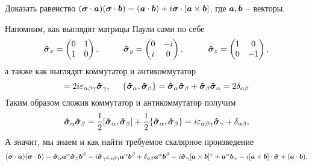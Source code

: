 \begin{leftrules}
	Доказать равенство $(\mbox{\boldmath $\sigma$} \cdot \mbox{\boldmath $a$})(\mbox{\boldmath $\sigma$} \cdot \mbox{\boldmath $b$}) = (\mbox{\boldmath $a$} \cdot \mbox{\boldmath $b$}) + i \mbox{\boldmath $\sigma$}\cdot [\mbox{\boldmath $a$} \times \mbox{\boldmath $b$}]$, где $\mbox{\boldmath $a$}, \mbox{\boldmath $b$}$ -- векторы.
\end{leftrules}
Напомним, как выглядят матрицы Паули сами по себе
\begin{equation*}
	\mbox{\boldmath $\hat{\sigma}$}_x = \begin{pmatrix}
	    0 & 1 \\
	    1 & 0 \\
	\end{pmatrix},
	\hspace{1 cm}
	\mbox{\boldmath $\hat{\sigma}$}_y = \begin{pmatrix}
	    0 & -i \\
	    i & 0 \\
	\end{pmatrix},
	\hspace{1 cm}
	\mbox{\boldmath $\hat{\sigma}$}_z = \begin{pmatrix}
	    1 & 0 \\
	    0 & -1 \\
	\end{pmatrix},
\end{equation*}
а также как выглядят коммутатор и антикоммутатор
\begin{equation*}
	[\vc{\hat{\sigma}}_\alpha, \vc{\hat{\sigma}}_\beta] 
	= 2 i \varepsilon_{\alpha \beta \gamma} \vc{\hat{\sigma}}_\gamma,
	\hspace{0.5 cm}
	\{\vc{\hat{\sigma}}_\alpha, \vc{\hat{\sigma}}_\beta\}
	= \vc{\hat{\sigma}}_\alpha \vc{\hat{\sigma}}_\beta + \vc{\hat{\sigma}}_\beta \vc{\hat{\sigma}}_\alpha
	= 2 \delta_{\alpha \beta}
\end{equation*}
Таким образом сложив коммутатор и антикоммутатор получим
\begin{equation*}
	\mbox{\boldmath $\hat{\sigma}$}_\alpha \mbox{\boldmath $\hat{\sigma}$}_\beta  = \frac{1}{2} [\mbox{\boldmath $\hat{\sigma}$}_\alpha, \mbox{\boldmath $\hat{\sigma}$}_\beta] + \frac{1}{2} \{\mbox{\boldmath $\hat{\sigma}$}_\alpha, \mbox{\boldmath $\hat{\sigma}$}_\beta\}
	=
	i \varepsilon_{\alpha \beta \gamma} \mbox{\boldmath $\hat{\sigma}$}_\gamma + \delta_{\alpha\beta},
\end{equation*}
А значит, мы знаем и как найти требуемое скалярное произведение
\begin{equation*}
	(\mbox{\boldmath $\sigma$} \cdot \mbox{\boldmath $a$})(\mbox{\boldmath $\sigma$} \cdot \mbox{\boldmath $b$}) = 
	\mbox{\boldmath $\hat{\sigma}$}_\alpha \mbox{\boldmath $a$}^\alpha  \mbox{\boldmath $\hat{\sigma}$}_\beta \mbox{\boldmath $b$}^\beta
	=
	i \mbox{\boldmath $\hat{\sigma}$}_\gamma \varepsilon_{\alpha \beta \gamma} \mbox{\boldmath $a$}^\alpha \mbox{\boldmath $b$}^\beta  + \delta_{\alpha\beta} \mbox{\boldmath $a$}^\alpha \mbox{\boldmath $b$}^\beta
	=
	i \mbox{\boldmath $\hat{\sigma}$}_\gamma [\mbox{\boldmath $a$} \times \mbox{\boldmath $b$}]^\gamma + \mbox{\boldmath $a$}^\alpha \mbox{\boldmath $b$}_\alpha
	=
	i [\mbox{\boldmath $a$} \times \mbox{\boldmath $b$}]\cdot \mbox{\boldmath $\hat{\sigma}$} + (\mbox{\boldmath $a$} \cdot \mbox{\boldmath $b$}).
\end{equation*}
